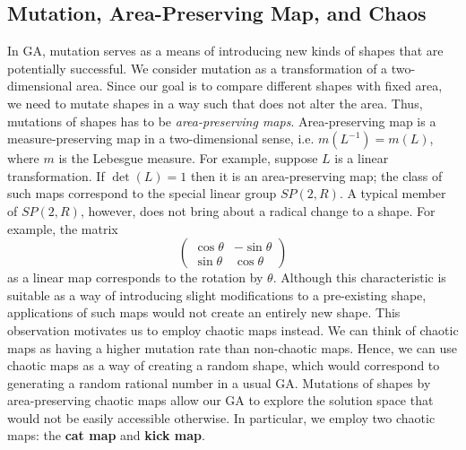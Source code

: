 \documentclass[12pt]{reedmcm}
\begin{document}
\subsection{Mutation, Area-Preserving Map, and Chaos}
In GA, mutation serves as a means of introducing new kinds of shapes that are potentially successful.
We consider mutation as a transformation of a two-dimensional area.
Since our goal is to compare different shapes with fixed area, we need to mutate shapes in a way such that does not alter the area.
Thus, mutations of shapes has to be \textit{area-preserving maps}.
Area-preserving map is a measure-preserving map in a two-dimensional sense, i.e. $m(L^{-1}) = m(L)$, where $m$ is the Lebesgue measure.
For example, suppose $L$ is a linear transformation.
If $\det(L) = 1$ then it is an area-preserving map; the class of such maps correspond to the special linear group $SP(2,R)$.
A typical member of $SP(2,R)$, however, does not bring about a radical change to a shape.
For example, the matrix
\begin{equation*}
\begin{pmatrix}
    \cos\theta & -\sin\theta  \\
    \sin\theta & \cos\theta  
  \end{pmatrix}
\end{equation*}
as a linear map corresponds to the rotation by $\theta$. 
Although this characteristic is suitable as a way of introducing slight modifications to a pre-existing shape, applications of such maps would not create an entirely new shape.
This observation motivates us to employ chaotic maps instead.
We can think of chaotic maps as having a higher mutation rate than non-chaotic maps.
Hence, we can use chaotic maps as a way of creating a random shape, which would correspond to generating a random rational number in a usual GA.
Mutations of shapes by area-preserving chaotic maps allow our GA to explore the solution space that would not be easily accessible otherwise.
In particular, we employ two chaotic maps: the \textbf{cat map} and \textbf{kick map}.
\end{document}
